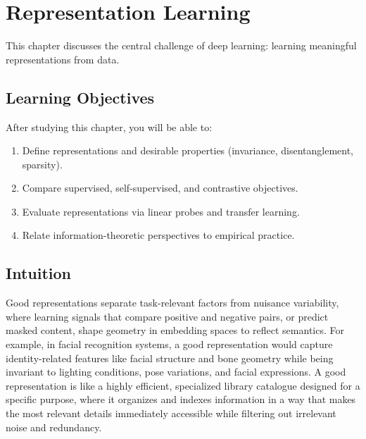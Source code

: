 
\chapter{Representation Learning}
\label{chap:representation-learning}

This chapter discusses the central challenge of deep learning: learning meaningful representations from data.


\section*{Learning Objectives}

After studying this chapter, you will be able to:

\begin{enumerate}
    \item Define representations and desirable properties (invariance, disentanglement, sparsity).
    \item Compare supervised, self-supervised, and contrastive objectives.
    \item Evaluate representations via linear probes and transfer learning.
    \item Relate information-theoretic perspectives to empirical practice.
\end{enumerate}



\section*{Intuition}

Good representations separate task-relevant factors from nuisance variability, where learning signals that compare positive and negative pairs, or predict masked content, shape geometry in embedding spaces to reflect semantics. For example, in facial recognition systems, a good representation would capture identity-related features like facial structure and bone geometry while being invariant to lighting conditions, pose variations, and facial expressions. A good representation is like a highly efficient, specialized library catalogue designed for a specific purpose, where it organizes and indexes information in a way that makes the most relevant details immediately accessible while filtering out irrelevant noise and redundancy.

